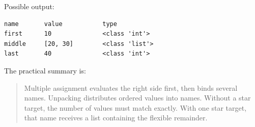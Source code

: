 Possible output:

\begin{verbatim}
name       value           type
first      10              <class 'int'>
middle     [20, 30]        <class 'list'>
last       40              <class 'int'>
\end{verbatim}

The practical summary is:

\begin{quote}
Multiple assignment evaluates the right side first, then binds several names. Unpacking distributes ordered values into names. Without a star target, the number of values must match exactly. With one star target, that name receives a list containing the flexible remainder.
\end{quote}